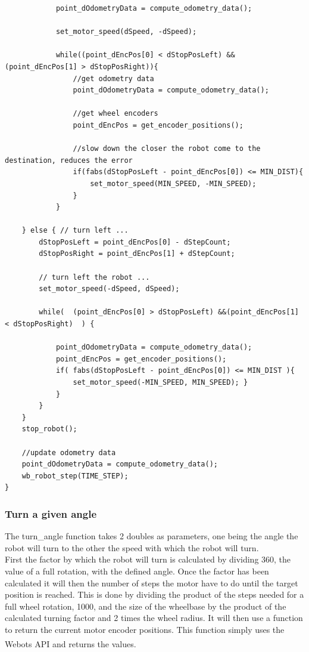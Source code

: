 \documentclass[10pt,a4paper]{article}
\begin{document}
\begin{flushleft}
\begin{lstlisting}
			point_dOdometryData = compute_odometry_data();
			
			set_motor_speed(dSpeed, -dSpeed);
			
			while((point_dEncPos[0] < dStopPosLeft) && (point_dEncPos[1] > dStopPosRight)){
				//get odometry data
				point_dOdometryData = compute_odometry_data();
				
				//get wheel encoders
				point_dEncPos = get_encoder_positions();
				
				//slow down the closer the robot come to the destination, reduces the error
				if(fabs(dStopPosLeft - point_dEncPos[0]) <= MIN_DIST){
					set_motor_speed(MIN_SPEED, -MIN_SPEED);
				}
			}	
		
	} else { // turn left ...
		dStopPosLeft = point_dEncPos[0] - dStepCount;
		dStopPosRight = point_dEncPos[1] + dStepCount; 

		// turn left the robot ...
		set_motor_speed(-dSpeed, dSpeed);

		while(  (point_dEncPos[0] > dStopPosLeft) &&(point_dEncPos[1] < dStopPosRight)  ) {

			point_dOdometryData = compute_odometry_data();
			point_dEncPos = get_encoder_positions();
			if( fabs(dStopPosLeft - point_dEncPos[0]) <= MIN_DIST ){
				set_motor_speed(-MIN_SPEED, MIN_SPEED); }
			}
		}
	}
	stop_robot();
	
	//update odometry data
	point_dOdometryData = compute_odometry_data();
	wb_robot_step(TIME_STEP);
}
\end{lstlisting}

\subsubsection{Turn a given angle}
The turn\_angle function takes 2 doubles as parameters, one being the angle the robot will turn to the other the speed with which the robot will turn.\\
First the factor by which the robot will turn is calculated by dividing 360, the value of a full rotation, with the defined angle.
Once the factor has been calculated it will then the number of steps the motor have to do until the target position is reached. This is done by dividing the product of the steps needed for a full wheel rotation, 1000, and the size of the wheelbase by the product of the calculated turning factor and 2 times the wheel radius. It will then use a function to return the current motor encoder positions. This function simply uses the Webots\textsuperscript{\texttrademark}  API and returns the values. \\[3ex]


\end{flushleft}
\end{document}
